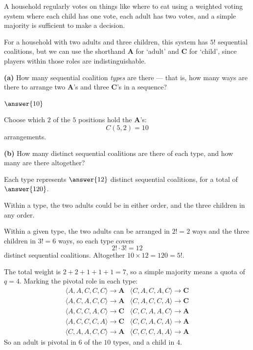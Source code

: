 \documentclass[12pt]{ximera}
\begin{document}
\begin{problem}
A household regularly votes on things like where to eat using a weighted voting
system where each child has one vote, each adult has two
votes, and a simple majority is sufficient to make a decision.

For a household with two adults and three children, this system has $5!$ sequential
coalitions, but we can use the shorthand \textbf{A} for `adult' and \textbf{C} for
`child', since players within those roles are indistinguishable.

\begin{prompt}
\textbf{(a)} How many sequential coalition \emph{types} are there --- that is, how many
ways are there to arrange two \textbf{A}'s and three \textbf{C}'s in a sequence?

$\answer{10}$

\begin{feedback}
Choose which $2$ of the $5$ positions hold the \textbf{A}'s:
\[ C(5,2) = 10 \]
arrangements.
\end{feedback}
\end{prompt}

\begin{prompt}
\textbf{(b)} How many distinct sequential coalitions are there of each type, and how
many are there altogether?

Each type represents $\answer{12}$ distinct sequential coalitions, for a total of
$\answer{120}$.

\begin{hint}
Within a type, the two adults could be in either order, and the three children in any
order.
\end{hint}

\begin{feedback}
Within a given type, the two adults can be arranged in $2!=2$ ways and the three
children in $3!=6$ ways, so each type covers
\[ 2!\cdot 3! = 12 \]
distinct sequential coalitions. Altogether $10 \times 12 = 120 = 5!$. \checkmark

The total weight is $2+2+1+1+1 = 7$, so a simple majority means a quota of $q = 4$.
Marking the pivotal role in each type:
\[
\begin{array}{ll}
\langle A,A,C,C,C\rangle \to \textbf{A} &
\langle C,A,C,A,C\rangle \to \textbf{C}\\
\langle A,C,A,C,C\rangle \to \textbf{A} &
\langle C,A,C,C,A\rangle \to \textbf{C}\\
\langle A,C,C,A,C\rangle \to \textbf{C} &
\langle C,C,A,A,C\rangle \to \textbf{A}\\
\langle A,C,C,C,A\rangle \to \textbf{C} &
\langle C,C,A,C,A\rangle \to \textbf{A}\\
\langle C,A,A,C,C\rangle \to \textbf{A} &
\langle C,C,C,A,A\rangle \to \textbf{A}
\end{array}
\]
So an adult is pivotal in $6$ of the $10$ types, and a child in $4$.
\end{feedback}
\end{prompt}


\end{problem}
\end{document}
